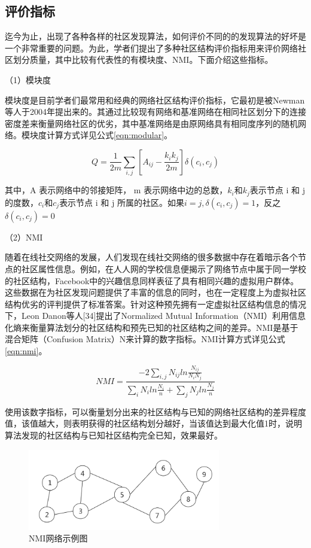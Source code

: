 \subsection{评价指标}
迄今为止，出现了各种各样的社区发现算法，如何评价不同的的发现算法的好坏是一个非常重要的问题。为此，学者们提出了多种社区结构评价指标用来评价网络社区划分质量，其中比较有代表性的有模块度、NMI。下面介绍这些指标。

（1）模块度

模块度是目前学者们最常用和经典的网络社区结构评价指标，它最初是被Newman等人于2004年提出来的\cite{2002Community}。其通过比较现有网络和基准网络在相同社区划分下的连接密度差来衡量网络社区的优劣，其中基准网络是由原网络具有相同度序列的随机网络。模块度计算方式详见公式\ref{eqn:modular}。

\begin{equation}
  \label{eqn:modular}
  Q=\frac{1}{2m}\sum_{i,j}\left [ A_{ij}-\frac{k_ik_j}{2m} \right ]\delta (c_i, c_j)  
\end{equation}

其中，A 表示网络中的邻接矩阵， m 表示网络中边的总数，$k_i$和$k_j$表示节点 i 和 j 的度数，$c_i$和$c_j$表示节点 i 和 j 所属的社区。如果$i=j,\delta(c_i,c_j)=1$，反之$\delta(c_i,c_j)=0$

（2）NMI

随着在线社交网络的发展，人们发现在线社交网络的很多数据中存在着暗示各个节点的社区属性信息。例如，在人人网的学校信息便揭示了网络节点中属于同一学校的社区结构，Facebook中的兴趣信息同样表征了具有相同兴趣的虚拟用户群体。这些数据在为社区发现问题提供了丰富的信息的同时，也在一定程度上为虚拟社区结构优劣的评判提供了标准答案。针对这种预先拥有一定虚拟社区结构信息的情况下，Leon Danon等人[34]提出了Normalized Mutual Information（NMI）利用信息化熵来衡量算法划分的社区结构和预先已知的社区结构之间的差异。NMI是基于混合矩阵（Confusion Matrix）N来计算的数字指标。NMI计算方式详见公式\ref{eqn:nmi}。

\begin{equation}
  \label{eqn:nmi}
  NMI=\frac{ -2 \sum_{i,j} N_{ij}  ln{\frac{N_{ij}}{N_iN_j}} } {\sum_{i}N_iln{\frac{N_i}{n}}+\sum_{j}N_jln{\frac{N_j}{n}}}
\end{equation}

使用该数字指标，可以衡量划分出来的社区结构与已知的网络社区结构的差异程度值，该值越大，则表明获得的社区结构划分越好，当该值达到最大化值1时，说明算法发现的社区结构与已知社区结构完全已知，效果最好。

\begin{figure}
 \centering
 \includegraphics[width=0.75\textwidth]{figures/fig5-1}
 \caption{NMI网络示例图}\label{fig:fig5-1}
\end{figure}

